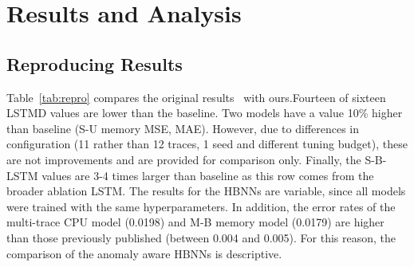 \documentclass[conference]{IEEEtran}
\begin{document}
\section{Results and Analysis}\label{results-and-analysis}

\subsection{Reproducing Results}\label{reproducing-results}

Table~\ref{tab:repro} compares the original results~\cite{ref1} with ours.Fourteen of sixteen LSTMD values are lower than the baseline. Two models have a value 10\% higher than baseline (S-U memory MSE, MAE). However, due to differences in configuration (11 rather than 12 traces, 1 seed and different tuning budget), these are not improvements and are provided for comparison only. Finally, the S-B-LSTM values are 3-4 times larger than baseline as this row comes from the broader ablation LSTM. The results for the HBNNs are variable, since all models were trained with the same hyperparameters. In addition, the error rates of the multi-trace CPU model (0.0198) and M-B memory model (0.0179) are higher than those previously published (between 0.004 and 0.005). For this reason, the comparison of the anomaly aware HBNNs is descriptive.
\end{document}
